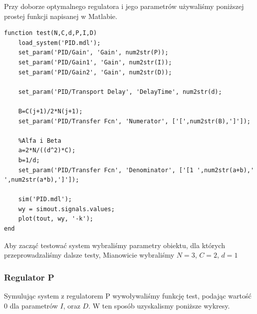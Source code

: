 \documentclass[a4paper,10pt]{article}
\begin{document}
Przy doborze optymalnego regulatora i jego parametrów używaliśmy poniższej prostej funkcji napisanej w Matlabie.

\begin{lstlisting}[caption=Funkcja testująca system.]
function test(N,C,d,P,I,D)
    load_system('PID.mdl');
    set_param('PID/Gain', 'Gain', num2str(P));   
    set_param('PID/Gain1', 'Gain', num2str(I));   
    set_param('PID/Gain2', 'Gain', num2str(D));
   
    set_param('PID/Transport Delay', 'DelayTime', num2str(d);        
        
    B=C(j+1)/2*N(j+1);
    set_param('PID/Transfer Fcn', 'Numerator', ['[',num2str(B),']']);        
        
    %Alfa i Beta 
    a=2*N/((d^2)*C);
    b=1/d;
    set_param('PID/Transfer Fcn', 'Denominator', ['[1 ',num2str(a+b),' ',num2str(a*b),']']);        
        
    sim('PID.mdl');
    wy = simout.signals.values;    
  	plot(tout, wy, '-k');
end
\end{lstlisting}

Aby zacząć testować system wybraliśmy parametry obiektu, dla których przeprowadzaliśmy dalsze testy, Mianowicie wybraliśmy $N = 3$, $C = 2$, $d = 1$

\newpage
\subsubsection{Regulator P}

Symulując system z regulatorem P wywoływaliśmy funkcję test, podając wartość $0$ dla parametrów $I$, oraz $D$. W ten sposób uzyskalismy poniższe wykresy.
\end{document}
